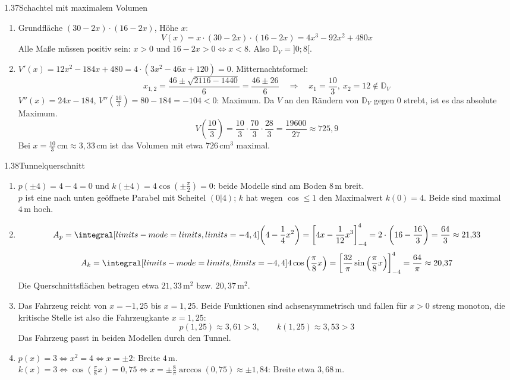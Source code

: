 \begin{loesung}{1.37}{Schachtel mit maximalem Volumen}
\begin{enumerate}[label=\alph*)]
  \item Grundfläche $(30-2x)\cdot(16-2x)$, Höhe $x$:
  \[V(x) = x\cdot(30-2x)\cdot(16-2x) = 4x^3-92x^2+480x\]
  Alle Maße müssen positiv sein: $x>0$ und $16-2x>0\Longleftrightarrow x<8$. Also $\mathds{D}_V = ]0;8[$.
  \item $V'(x) = 12x^2-184x+480 = 4\cdot(3x^2-46x+120) = 0$. Mitternachtsformel:
  \[x_{1,2} = \dfrac{46\pm\sqrt{2116-1440}}{6} = \dfrac{46\pm 26}{6}\quad\Longrightarrow\quad x_1 = \dfrac{10}{3},\ x_2 = 12\notin\mathds{D}_V\]
  $V''(x) = 24x-184$, $V''(\frac{10}{3}) = 80-184 = -104<0$: Maximum. Da $V$ an den Rändern von $\mathds{D}_V$ gegen $0$ strebt, ist es das absolute Maximum.
  \[V\left(\dfrac{10}{3}\right) = \dfrac{10}{3}\cdot\dfrac{70}{3}\cdot\dfrac{28}{3} = \dfrac{19600}{27}\approx 725{,}9\]
  Bei $x = \frac{10}{3}\,\text{cm}\approx 3{,}33\,\text{cm}$ ist das Volumen mit etwa $726\,\text{cm}^3$ maximal.
\end{enumerate}
\end{loesung}

\begin{loesung}{1.38}{Tunnelquerschnitt}
\begin{enumerate}[label=\alph*)]
  \item $p(\pm 4) = 4-4 = 0$ und $k(\pm 4) = 4\cos{\left(\pm\frac{\pi}{2}\right)} = 0$: beide Modelle sind am Boden $8\,\text{m}$ breit.\\
  $p$ ist eine nach unten geöffnete Parabel mit Scheitel $(0|4)$; $k$ hat wegen $\cos\leq 1$ den Maximalwert $k(0) = 4$. Beide sind maximal $4\,\text{m}$ hoch.
  \item \[A_p = \integral[limits-mode=limits,limits={-4, 4}]{\left(4-\dfrac{1}{4}x^2\right)} = \left[4x-\dfrac{1}{12}x^3\right]_{-4}^4 = 2\cdot\left(16-\dfrac{16}{3}\right) = \dfrac{64}{3}\approx 21{,}33\]
  \[A_k = \integral[limits-mode=limits,limits={-4, 4}]{4\cos{\left(\dfrac{\pi}{8}x\right)}} = \left[\dfrac{32}{\pi}\sin{\left(\dfrac{\pi}{8}x\right)}\right]_{-4}^4 = \dfrac{64}{\pi}\approx 20{,}37\]
  Die Querschnittsflächen betragen etwa $21{,}33\,\text{m}^2$ bzw. $20{,}37\,\text{m}^2$.
  \item Das Fahrzeug reicht von $x=-1{,}25$ bis $x=1{,}25$. Beide Funktionen sind achsensymmetrisch und fallen für $x>0$ streng monoton, die kritische Stelle ist also die Fahrzeugkante $x = 1{,}25$:
  \[p(1{,}25)\approx 3{,}61>3,\qquad k(1{,}25)\approx 3{,}53>3\]
  Das Fahrzeug passt in beiden Modellen durch den Tunnel.
  \item $p(x) = 3\Longleftrightarrow x^2 = 4\Longleftrightarrow x = \pm 2$: Breite $4\,\text{m}$.\\
  $k(x) = 3\Longleftrightarrow\cos{\left(\frac{\pi}{8}x\right)} = 0{,}75\Longleftrightarrow x = \pm\frac{8}{\pi}\arccos{(0{,}75)}\approx\pm 1{,}84$: Breite etwa $3{,}68\,\text{m}$.
\end{enumerate}
\end{loesung}

\LoesungskapitelEnde
